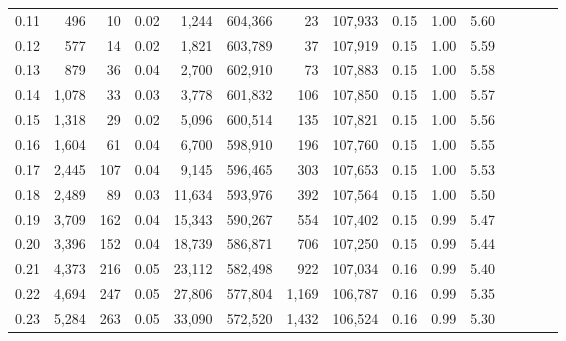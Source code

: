 \begin{tabular}{rrrcrrrrrrrrrrr}
0.11 &     496 &     10 &                                       0.02 &    1,244 &  604,366 &       23 &  107,933 &  0.15 &  1.00 &                         5.60 \\
0.12 &     577 &     14 &                                       0.02 &    1,821 &  603,789 &       37 &  107,919 &  0.15 &  1.00 &                         5.59 \\
0.13 &     879 &     36 &                                       0.04 &    2,700 &  602,910 &       73 &  107,883 &  0.15 &  1.00 &                         5.58 \\
0.14 &   1,078 &     33 &                                       0.03 &    3,778 &  601,832 &      106 &  107,850 &  0.15 &  1.00 &                         5.57 \\
0.15 &   1,318 &     29 &                                       0.02 &    5,096 &  600,514 &      135 &  107,821 &  0.15 &  1.00 &                         5.56 \\
0.16 &   1,604 &     61 &                                       0.04 &    6,700 &  598,910 &      196 &  107,760 &  0.15 &  1.00 &                         5.55 \\
0.17 &   2,445 &    107 &                                       0.04 &    9,145 &  596,465 &      303 &  107,653 &  0.15 &  1.00 &                         5.53 \\
0.18 &   2,489 &     89 &                                       0.03 &   11,634 &  593,976 &      392 &  107,564 &  0.15 &  1.00 &                         5.50 \\
0.19 &   3,709 &    162 &                                       0.04 &   15,343 &  590,267 &      554 &  107,402 &  0.15 &  0.99 &                         5.47 \\
0.20 &   3,396 &    152 &                                       0.04 &   18,739 &  586,871 &      706 &  107,250 &  0.15 &  0.99 &                         5.44 \\
0.21 &   4,373 &    216 &                                       0.05 &   23,112 &  582,498 &      922 &  107,034 &  0.16 &  0.99 &                         5.40 \\
0.22 &   4,694 &    247 &                                       0.05 &   27,806 &  577,804 &    1,169 &  106,787 &  0.16 &  0.99 &                         5.35 \\
0.23 &   5,284 &    263 &                                       0.05 &   33,090 &  572,520 &    1,432 &  106,524 &  0.16 &  0.99 &                         5.30 \\

\end{tabular}
